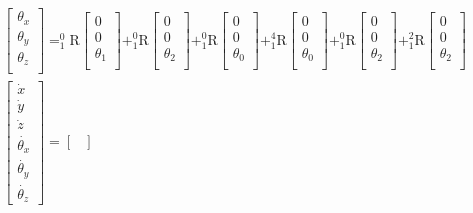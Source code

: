 \documentclass[12pt]{article}
\begin{document}
\begin{CJK}{UTF8}{bsmi}
\begin{equation*}
\begin{split}
&\begin{bmatrix}
\theta _x \\
\theta _y \\
\theta _z \\
\end{bmatrix}
=
_1^0\textrm{R}
\begin{bmatrix}
0 \\ 
0 \\ 
\theta _1\\
\end{bmatrix}
+
_1^0\textrm{R}
\begin{bmatrix}
0 \\ 
0 \\ 
\theta _2\\
\end{bmatrix}
+
_1^0\textrm{R}
\begin{bmatrix}
0 \\ 
0 \\ 
\theta _0\\
\end{bmatrix}
+
_1^4\textrm{R}
\begin{bmatrix}
0 \\ 
0 \\ 
\theta _0\\
\end{bmatrix}
+
_1^0\textrm{R}
\begin{bmatrix}
0 \\ 
0 \\ 
\theta _2\\
\end{bmatrix}
+
_1^2\textrm{R}
\begin{bmatrix}
0 \\ 
0 \\ 
\theta _2\\
\end{bmatrix}\\
&\begin{bmatrix}					
\dot{x} \\ 
\dot{y} \\ 
\dot{z}\\ 
\dot{\theta _x} \\ 
\dot{\theta _y} \\ 
\dot{\theta _z}
\end{bmatrix}
=
\begin{bmatrix}

\end{bmatrix}
\end{split}
\end{equation*}
\end{CJK}
\end{document}
